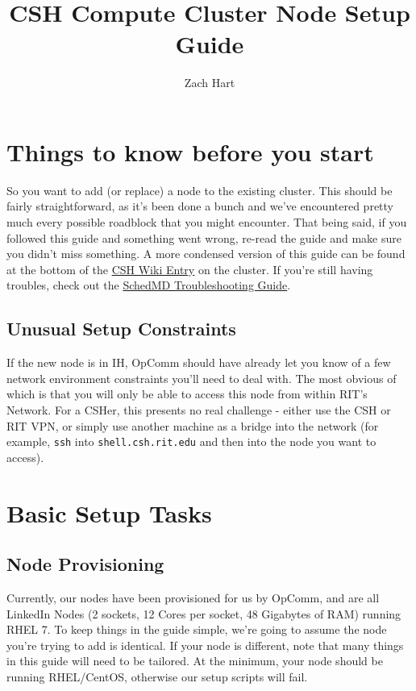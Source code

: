 \documentclass[a4paper]{article}
\title{CSH Compute Cluster Node Setup Guide}
\author{Zach Hart}
\begin{document}
\maketitle

\section{Things to know before you start}

So you want to add (or replace) a node to the existing cluster.
This should be fairly straightforward, as it's been done a bunch and we've encountered pretty much every possible roadblock that you might encounter.
That being said, if you followed this guide and something went wrong, re-read the guide and make sure you didn't miss something.
A more condensed version of this guide can be found at the bottom of the \href{https://wiki.csh.rit.edu/wiki/Beowulf_Cluster}{CSH Wiki Entry} on the cluster.
If you're still having troubles, check out the \href{https://slurm.schedmd.com/troubleshoot.html}{SchedMD Troubleshooting Guide}.

\subsection{Unusual Setup Constraints}

If the new node is in IH, OpComm should have already let you know of a few network environment constraints you'll need to deal with.
The most obvious of which is that you will only be able to access this node from within RIT's Network.
For a CSHer, this presents no real challenge - either use the CSH or RIT VPN, or simply use another machine as a bridge into the network (for example, \texttt{ssh} into \texttt{shell.csh.rit.edu} and then into the node you want to access). 

\section{Basic Setup Tasks}

\subsection{Node Provisioning}

Currently, our nodes have been provisioned for us by OpComm, and are all LinkedIn Nodes (2 sockets, 12 Cores per socket, 48 Gigabytes of RAM) running RHEL 7.
To keep things in the guide simple, we're going to assume the node you're trying to add is identical.
If your node is different, note that many things in this guide will need to be tailored.
At the minimum, your node should be running RHEL/CentOS, otherwise our setup scripts will fail.
\end{document}
